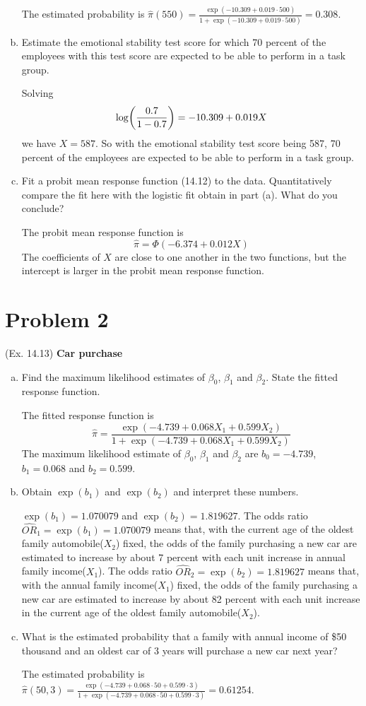 \documentclass[10pt]{report}
\DeclarePairedDelimiter\autoparen{(}{)}
\newcommand{\pa}[1]{\autoparen*{#1}}
\begin{document}
\begin{enumerate}[a.]
	The estimated probability is $\hat{\pi}(550) = \frac{\exp(-10.309 + 0.019\cdot 500)}{1 + \exp(-10.309 + 0.019\cdot 500)} = 0.308$.
	
	\item 
	Estimate the emotional stability test score for which 70 percent of the employees with this test score are expected to be able to perform in a task group.
	
	Solving
	\[
	\log\pa{\frac{0.7}{1-0.7}} = -10.309 + 0.019X
	\]
	we have $X=587$. So with the emotional stability test score being 587, 70 percent of the employees are expected to be able to perform in a task group.
	
	\item 
	Fit a probit mean response function (14.12) to the data. Quantitatively compare the fit here with the logistic fit obtain in part (a). What do you conclude?
	
	The probit mean response function is
	\[
	\hat{\pi} = \Phi(-6.374 + 0.012X)
	\]
	The coefficients of $X$ are close to one another in the two functions, but the intercept is larger in the probit mean response function.
\end{enumerate}

\section*{Problem 2}
(Ex. 14.13) \textbf{Car purchase}
\begin{enumerate}[a.]
	\item 
	Find the maximum likelihood estimates of $\beta_0$, $\beta_1$ and $\beta_2$. State the fitted response function.
	
	The fitted response function is 
	\[
	\hat{\pi} = \frac{\exp(-4.739 + 0.068X_1 + 0.599X_2)}{1 + \exp(-4.739 + 0.068X_1 + 0.599X_2)}
	\]
	The maximum likelihood estimate of $\beta_0$, $\beta_1$ and $\beta_2$ are $b_0 = -4.739$, $b_1 = 0.068$ and $b_2 = 0.599$.
	
	\item 
	Obtain $\exp(b_1)$ and $\exp(b_2)$ and interpret these numbers.
	
	$\exp(b_1) = 1.070079$ and $\exp(b_2) = 1.819627$. The odds ratio $\widehat{OR}_1 = \exp(b_1) = 1.070079$ means that, with the current age of the oldest family automobile($X_2$) fixed, the odds of the family purchasing a new car are estimated to increase by about 7 percent with each unit increase in annual family income($X_1$). The odds ratio $\widehat{OR}_2 = \exp(b_2) = 1.819627$ means that, with the annual family income($X_1$) fixed, the odds of the family purchasing a new car are estimated to increase by about 82 percent with each unit increase in the current age of the oldest family automobile($X_2$).
	
	\item 
	What is the estimated probability that a family with annual income of \$50 thousand and an oldest car of 3 years will purchase a new car next year?
	
	The estimated probability is $\hat{\pi}(50, 3) = \frac{\exp(-4.739 + 0.068\cdot 50 + 0.599\cdot 3)}{1 + \exp(-4.739 + 0.068\cdot 50 + 0.599\cdot 3)} = 0.61254$.
\end{enumerate}
\end{document}
